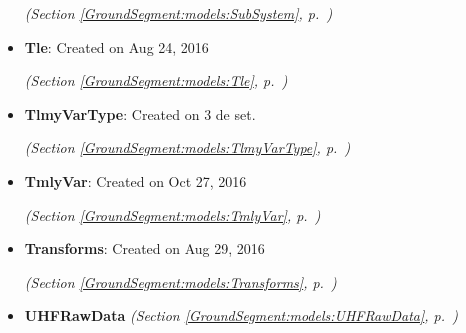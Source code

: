 \begin{itemize}
  \textit{(Section \ref{GroundSegment:models:SubSystem}, p.~\pageref{GroundSegment:models:SubSystem})}

\item \textbf{Tle}: Created on Aug 24, 2016



  \textit{(Section \ref{GroundSegment:models:Tle}, p.~\pageref{GroundSegment:models:Tle})}

\item \textbf{TlmyVarType}: Created on 3 de set.



  \textit{(Section \ref{GroundSegment:models:TlmyVarType}, p.~\pageref{GroundSegment:models:TlmyVarType})}

\item \textbf{TmlyVar}: Created on Oct 27, 2016



  \textit{(Section \ref{GroundSegment:models:TmlyVar}, p.~\pageref{GroundSegment:models:TmlyVar})}

\item \textbf{Transforms}: Created on Aug 29, 2016



  \textit{(Section \ref{GroundSegment:models:Transforms}, p.~\pageref{GroundSegment:models:Transforms})}

\item \textbf{UHFRawData}
  \textit{(Section \ref{GroundSegment:models:UHFRawData}, p.~\pageref{GroundSegment:models:UHFRawData})}

\end{itemize}

